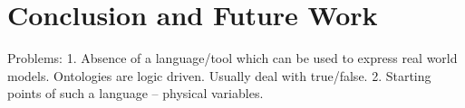 \chapter{Conclusion and Future Work}

Problems:
  1. Absence of a language/tool which can be used to express real world models. Ontologies are logic driven. Usually deal with true/false.
  2. Starting points of such a language -- physical variables.
